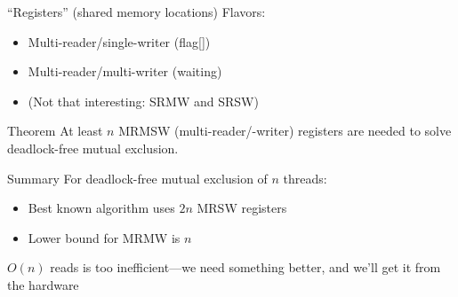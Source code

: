 \documentclass{beamer}
\begin{document}
\begin{frame}{“Registers” (shared memory locations)}{}
  Flavors:
  \begin{itemize}
    \item Multi-reader/single-writer (flag[])
    \item Multi-reader/multi-writer (waiting)
    \item (Not that interesting: SRMW and SRSW)
  \end{itemize}
\end{frame}

\begin{frame}{Theorem}{}
  At least $n$ MRMSW
  (multi-reader/-writer)
  registers are needed to
  solve deadlock-free mutual exclusion.

\end{frame}

\begin{frame}{Summary}{}
  For deadlock-free mutual exclusion of $n$ threads:
  \begin{itemize}
    \item Best known algorithm uses $2n$ MRSW registers
    \item Lower bound for MRMW is $n$
  \end{itemize}

  \pause
  $O(n)$ reads is too inefficient—we need something better, and we’ll get
  it from the hardware
\end{frame}
\end{document}
